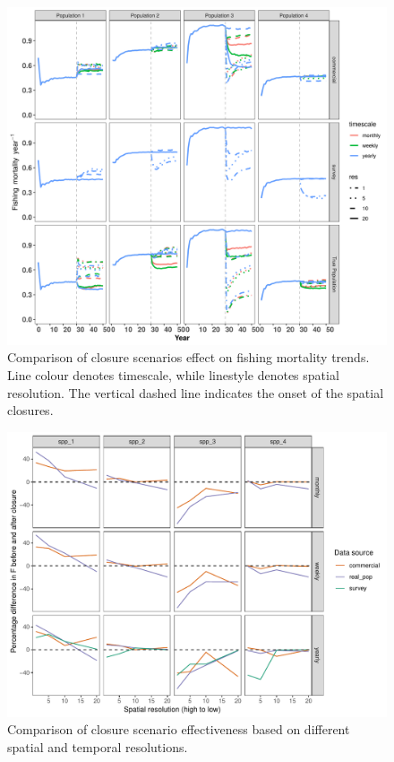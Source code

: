 \documentclass[review]{elsarticle}
\begin{document}
\begin{figure}[!ht]
	\includegraphics[width = \linewidth]{../analysis/F_trendsREV}
	\caption{Comparison of closure scenarios effect on fishing mortality
		trends. Line colour denotes timescale, while linestyle
		denotes spatial resolution. The vertical dashed line
		indicates the onset of the spatial closures.}
	\label{fig:3}
\end{figure}

\begin{figure}[!ht]
	\includegraphics[width =\linewidth]{../analysis/f_diff_effectiveness}
	\caption{Comparison of closure scenario effectiveness based on
		different spatial and temporal resolutions.}
	\label{fig:4}
\end{figure}	
\end{document}
